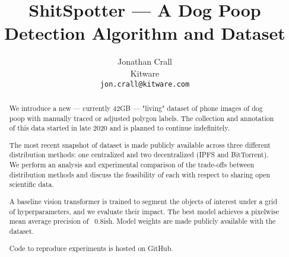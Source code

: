 \documentclass[10pt,twocolumn,letterpaper]{article}
\begin{document}
\title{ShitSpotter --- A Dog Poop Detection Algorithm and Dataset}

\author{Jonathan Crall\\
Kitware\\
{\tt\small jon.crall@kitware.com}
}
\maketitle

\begin{abstract}

We introduce a new --- currently 42GB --- "living" dataset of phone images of
dog poop with manually traced or adjusted polygon labels.
The collection and annotation of this data started in late 2020 and is planned
to continue indefinitely.

The most recent snapshot of dataset is made publicly available across three
different distribution methods: one centralized and two decentralized (IPFS and
BitTorrent).
We perform an analysis and experimental comparison of the trade-offs between
distribution methods and discuss the feasibility of each with respect to
sharing open scientific data.

A baseline vision transformer is trained to segment the objects of interest
under a grid of hyperparameters, and we evaluate their impact. The best model
achieves a pixelwise mean average precision of ~0.8ish. 
Model weights are made publicly available with the dataset. 

Code to reproduce experiments is hosted on GitHub.


\end{abstract}
\end{document}
